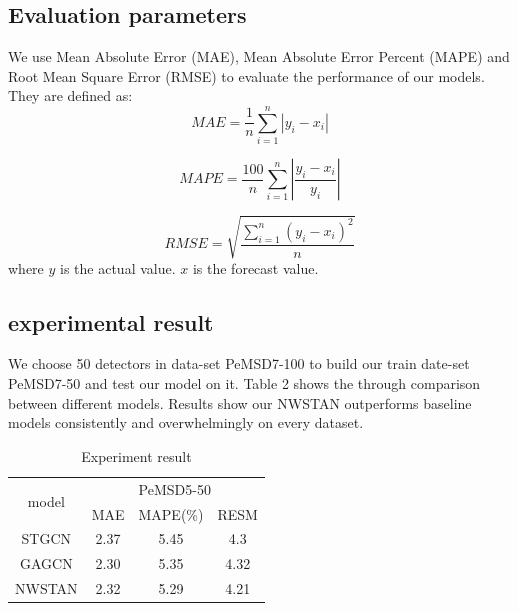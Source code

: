 \documentclass[conference]{IEEEtran}
\begin{document}
\subsection{Evaluation parameters}
\par
We use Mean Absolute Error (MAE), Mean Absolute Error Percent (MAPE) and Root Mean Square Error (RMSE) to evaluate the performance of our models. They are defined as:
\begin{equation}
    MAE = \frac{1}{n}{\sum_{i = 1}^{n}{\left|y_i - x_i\right|}}  
\end{equation}

\begin{equation}
    MAPE = \frac{100}{n}{\sum_{i = 1}^{n}{\left|{\frac{y_i - x_i}{y_i}}\right|}}
\end{equation}

\begin{equation}
    RMSE = \sqrt{\frac{\sum_{i = 1}^{n}{{\left(y_i - x_i\right)}^2}}{n}} 
\end{equation}    
where $y$ is the actual value. $x$ is the forecast value.

\subsection{experimental result}
We choose 50 detectors in data-set PeMSD7-100 to build our train date-set PeMSD7-50 and test our model on it. Table 2 shows the through comparison between different models. Results show our NWSTAN outperforms baseline models consistently and overwhelmingly on every dataset.


\begin{table}[]
    \caption{Experiment result}
    \begin{center}
    \begin{tabular}{|c|c|c|c|}
    \hline
    \multirow{2}{*}{model} & \multicolumn{3}{c|}{PeMSD5-50} \\ \cline{2-4} 
                           & MAE    & MAPE(\%)    & RESM    \\ \hline
        STGCN              & 2.37   & 5.45        & 4.3     \\ \hline
        GAGCN              & 2.30   & 5.35        & 4.32    \\ \hline
       NWSTAN              & 2.32   & 5.29        & 4.21    \\ \hline
                      
    \end{tabular}
    \end{center} 
    \label{table2}
\end{table}
\end{document}

